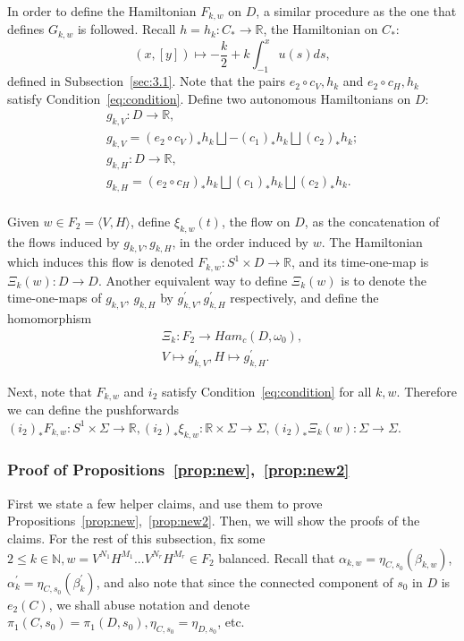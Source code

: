\documentclass[11pt]{article}
\newenvironment{myequation}
    {
        \begin{equation*}
        \begin{gathered}
    }
    { 
        \end{gathered} 
        \end{equation*}
    }
\newcommand{\R}{\mathbb{R}}
\newcommand{\N}{\mathbb{N}}
\begin{document}
            In order to define the Hamiltonian $F_{k,w}$ on $D$, a similar procedure as the one that defines $G_{k,w}$ is followed. Recall $h = h_k: C_* \to \R$, the Hamiltonian on $C_*$:
            \[
                (x,[y]) \mapsto -\frac{k}{2} + k \int_{-1}^x u(s) ds ,
            \]
            defined in Subsection~\ref{sec:3.1}. Note that the pairs $e_2 \circ c_V, h_k$ and $e_2 \circ c_H, h_k$ satisfy Condition~\ref{eq:condition}. Define two autonomous Hamiltonians on $D$:
            \begin{myequation}
                g_{k,V}: D \to \R , \\
                g_{k,V} = (e_2 \circ c_V)_* h_k \bigsqcup - (c_1)_* h_k \bigsqcup (c_2)_* h_k ; \\
                g_{k,H}: D \to \R , \\
                g_{k,H} = (e_2 \circ c_H)_* h_k \bigsqcup (c_1)_* h_k \bigsqcup (c_2)_* h_k . \\
            \end{myequation}
            
            Given $w \in F_2 = \langle V,H \rangle$, define $\xi_{k,w}(t)$, the flow on $D$, as the concatenation of the flows induced by $g_{k,V}, g_{k,H}$, in the order induced by $w$. The Hamiltonian which induces this flow is denoted $F_{k,w}: S^1 \times D \to \R$, and its time-one-map is $\Xi_k(w): D \to D$. Another equivalent way to define $\Xi_k(w)$ is to denote the time-one-maps of $g_{k,V}$, $g_{k,H}$ by $g_{k,V}^\prime, g_{k,H}^\prime$ respectively, and define the homomorphism
            \begin{myequation}
                \Xi_k: F_2 \to Ham_c(D,\omega_0) , \\
                V \mapsto g_{k,V}^\prime, H \mapsto g_{k,H}^\prime .
            \end{myequation}
            
            Next, note that $F_{k,w}$ and $i_2$ satisfy Condition~\ref{eq:condition} for all $k,w$. Therefore we can define the pushforwards $(i_2)_* F_{k,w}: S^1 \times \Sigma \to \R, (i_2)_* \xi_{k,w}: \R \times \Sigma \to \Sigma, (i_2)_* \Xi_k(w): \Sigma \to \Sigma$.
        
        \subsubsection{Proof of Propositions~\ref{prop:new},~\ref{prop:new2}}
        \label{sec:3.2.2}
            First we state a few helper claims, and use them to prove Propositions~\ref{prop:new},~\ref{prop:new2}. Then, we will show the proofs of the claims. For the rest of this subsection, fix some $2 \leq k \in \N, w = V^{N_1} H^{M_1} ... V^{N_r} H^{M_r} \in F_2$ balanced. Recall that $\alpha_{k,w} = \eta_{C,s_0}(\beta_{k,w})$, $\alpha_k^\prime = \eta_{C,s_0}(\beta_k^\prime)$, and also note that since the connected component of $s_0$ in $D$ is $e_2(C)$, we shall abuse notation and denote $\pi_1(C,s_0) = \pi_1(D,s_0), \eta_{C,s_0} = \eta_{D,s_0}$, etc.
            
\end{document}
